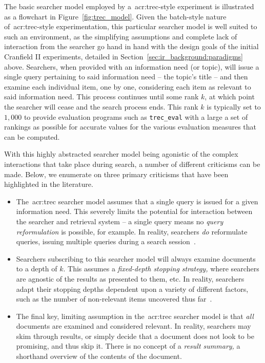 The basic searcher model employed by a~\gls{acr:trec}-style experiment is illustrated as a flowchart in Figure~\ref{fig:trec_model}. Given the batch-style nature of~\gls{acr:trec}-style experimentation, this particular searcher model is well suited to such an environment, as the simplifying assumptions and complete lack of interaction from the searcher go hand in hand with the design goals of the initial Cranfield II experiments, detailed in Section~\ref{sec:ir_background:paradigms} above. Searchers, when provided with an information need (or topic), will issue a single query pertaining to said information need -- the topic's title -- and then examine each individual item, one by one, considering each item as relevant to said information need. This process continues until some rank $k$, at which point the searcher will cease and the search process ends. This rank $k$ is typically set to $1,000$ to provide evaluation programs such as \texttt{trec\_eval} with a large a set of rankings as possible for accurate values for the various evaluation measures that can be computed.

With this highly abstracted searcher model being agonistic of the complex interactions that take place during search, a number of different criticisms can be made. Below, we enumerate on three primary criticisms that have been highlighted in the literature.

\begin{itemize}
    \item{ The~\gls{acr:trec} searcher model assumes that a single query is issued for a given information need. This severely limits the potential for interaction between the searcher and retrieval system -- a single query means no \emph{query reformulation} is possible, for example. In reality, searchers \emph{do} reformulate queries, issuing multiple queries during a search session~\citep{keskustalo2009querying}.}
    \item{ Searchers subscribing to this searcher model will always examine documents to a depth of $k$. This assumes a \emph{fixed-depth stopping strategy,} where searchers are agnostic of the results as presented to them, etc. In reality, searchers adapt their stopping depths dependent upon a variety of different factors, such as the number of non-relevant items uncovered thus far~\citep{cooper1973retrieval_effectiveness_ii}.}
    \item{ The final key, limiting assumption in the~\gls{acr:trec} searcher model is that \emph{all} documents are examined and considered relevant. In reality, searchers may skim through results, or simply decide that a document does not look to be promising, and thus skip it. There is no concept of a \emph{result summary,} a shorthand overview of the contents of the document.}
\end{itemize}


